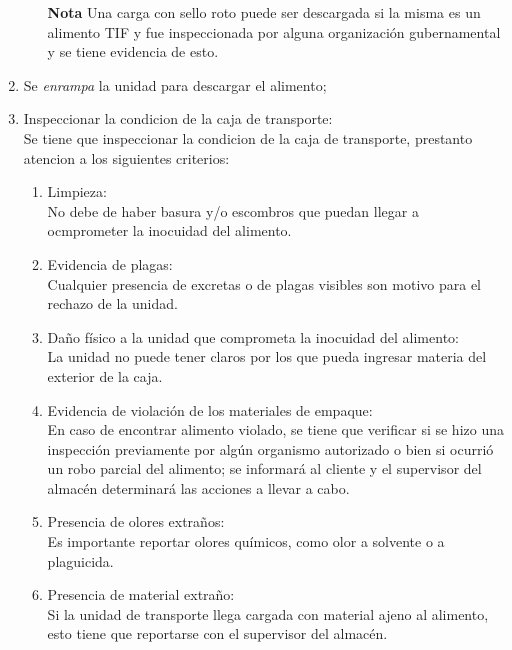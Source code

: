 \begin{enumerate}
        \begin{itemize}
            \item[\textbf{Nota}] Una carga con sello roto puede ser descargada si la misma es un alimento TIF y fue inspeccionada por alguna organización gubernamental y se tiene evidencia de esto.
        \end{itemize}

    \item Se \textit{enrampa} la unidad para descargar el alimento;
    
    \item Inspeccionar la condicion de la caja de transporte:\\
    Se tiene que inspeccionar la condicion de la caja de transporte, prestanto atencion a los siguientes criterios:
    \begin{enumerate}
        \item Limpieza:\\    
        No debe de haber basura y/o escombros que puedan llegar a ocmprometer la inocuidad del alimento.

        \item Evidencia de plagas:\\
        Cualquier presencia de excretas o de plagas visibles son motivo para el rechazo de la unidad.
        
        \item Daño físico a la unidad que comprometa la inocuidad del alimento:\\
        La unidad no puede tener claros por los que pueda ingresar materia del exterior de la caja.

        \item Evidencia de violación de los materiales de empaque:\\
        En caso de encontrar alimento violado, se tiene que verificar si se hizo una inspección previamente por algún organismo autorizado o bien si ocurrió un robo parcial del alimento; se informará al cliente y el supervisor del almacén determinará las acciones a llevar a cabo.

        \item Presencia de olores extraños:\\
        Es importante reportar olores químicos, como olor a solvente o a plaguicida.
        
        \item Presencia de material extraño:\\
        Si la unidad de transporte llega cargada con material ajeno al alimento, esto tiene que reportarse con el supervisor del almacén.
    \end{enumerate}
\end{enumerate}

